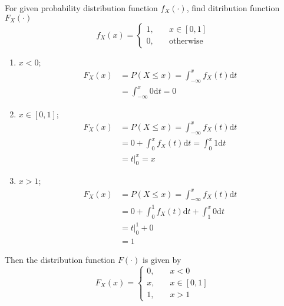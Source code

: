 \documentclass[twoside]{article}
\makeatletter
\theoremstyle{definition}
\theoremstyle{remark}
\theoremstyle{remark}
\newenvironment{example}
 {\patchcmd{\@thm}{\trivlist}{\list{}{\leftmargin=3em \rightmargin=3em}}{}{}%
  \vspace*{10\p@}
  \innerexample\pushQED{\hfill\ensuremath{\Diamond}}}
 {\popQED\endinnerexample}
\makeatother
\begin{document}
\begin{example}
  For given probability distribution function $f_X(\cdot)$, find ditribution
  function $F_X(\cdot)$
  \begin{equation*}
    f_X(x) = \left\{
    \begin{array}{ll}
      1, & \quad x \in [0, 1] \\
      0, & \quad \textrm{otherwise}
    \end{array}
    \right.
  \end{equation*}
  \begin{enumerate}
    \item $x < 0$;
    \begin{equation*}
      \begin{split}
        F_X(x)
        &= P(X \leq x) = \int_{-\infty}^{x} f_X(t) \mathrm{d}t \\
        &= \int_{-\infty}^{x} 0 \mathrm{d}t = 0
      \end{split}
    \end{equation*}
    \item $x \in [0, 1]$;
    \begin{equation*}
      \begin{split}
        F_X(x)
        &= P(X \leq x) = \int_{-\infty}^{x} f_X(t) \mathrm{d}t \\
        &= 0 + \int_{0}^{x} f_X(t) \mathrm{d}t = \int_{0}^{x} 1 \mathrm{d}t \\
        &= \left. t \right|_{0}^{x} = x
      \end{split}
    \end{equation*}
    \item $x > 1$;
    \begin{equation*}
      \begin{split}
        F_X(x)
        &= P(X \leq x) = \int_{-\infty}^{x} f_X(t) \mathrm{d}t \\
        &= 0 + \int_{0}^{1} f_X(t) \mathrm{d}t + \int_{1}^{x} 0 \mathrm{d}t \\
        &= \left. t \right|_{0}^{1} + 0 \\
        &= 1
      \end{split}
    \end{equation*}
  \end{enumerate}
  Then the distribution function $F(\cdot)$ is given by
  \begin{equation*}
    F_X(x) = \left\{
    \begin{array}{ll}
      0, & \quad x < 0 \\
      x, & \quad x \in [0, 1] \\
      1, & \quad x > 1
    \end{array}
    \right.
  \end{equation*}
\end{example}
\end{document}
